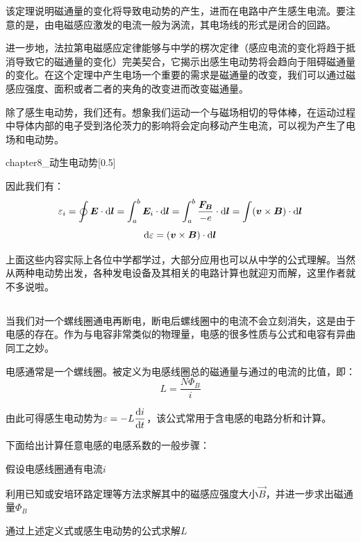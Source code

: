 该定理说明磁通量的变化将导致电动势的产生，进而在电路中产生感生电流。要注意的是，由电磁感应激发的电流一般为涡流，其电场线的形式是闭合的回路。

进一步地，法拉第电磁感应定律能够与中学的楞次定律（感应电流的变化将趋于抵消导致它的磁通量的变化）完美契合，它揭示出感生电动势将会趋向于阻碍磁通量的变化。在这个定理中产生电场一个重要的需求是磁通量的改变，我们可以通过磁感应强度、面积或者二者的夹角的改变进而改变磁通量。

除了感生电动势，我们还有。想象我们运动一个与磁场相切的导体棒，在运动过程中导体内部的电子受到洛伦茨力的影响将会定向移动产生电流，可以视为产生了电场和电动势。
\begin{singlefigure}[动生电动势]{chapter8_动生电动势}[0.5]
\end{singlefigure}

因此我们有：
\[\varepsilon_i = \oint \vec{E}\cdot\dif{\vec{l}}=\int_a^b \vec{E}_i\cdot\dif{\vec{l}} = \int_a^b \dfrac{\vec{F_B}}{-e}\cdot\dif{\vec{l}} = \int (\vec{v}\times\vec{B})\cdot\dif{\vec{l}}\]
\[\dif{\varepsilon} = (\vec{v}\times\vec{B})\cdot\dif{\vec{l}}\]

上面这些内容实际上各位中学都学过，大部分应用也可以从中学的公式理解。当然从两种电动势出发，各种发电设备及其相关的电路计算也就迎刃而解，这里作者就不多说啦。
\subsection[电感及其性质]{}
当我们对一个螺线圈通电再断电，断电后螺线圈中的电流不会立刻消失，这是由于电感的存在。作为与电容非常类似的物理量，电感的很多性质与公式和电容有异曲同工之妙。

\begin{law}
    电感通常是一个螺线圈。被定义为电感线圈总的磁通量与通过的电流的比值，即：
    \[L = \dfrac{N\Phi_B}{i}\]

    由此可得感生电动势为$\varepsilon = -L\dfrac{\dif{i}}{\dif{t}}$，该公式常用于含电感的电路分析和计算。
\end{law}

下面给出计算任意电感的电感系数的一般步骤：
\begin{Itemize}
    \item 假设电感线圈通有电流$i$
    \item 利用已知或安培环路定理等方法求解其中的磁感应强度大小$\vec{B}$，并进一步求出磁通量$\Phi_B$
    \item 通过上述定义式或感生电动势的公式求解$L$
\end{Itemize}

